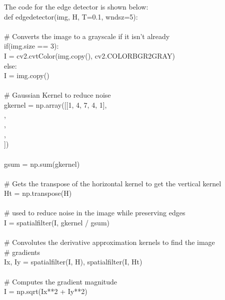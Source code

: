 \documentclass{article}
\begin{document}
	The code for the edge detector is shown below:\\
	
	\noindent def edge\textunderscore detector(img, H, T=0.1, wndsz=5):\\
	\\
	\indent \# Converts the image to a grayscale if it isn't already\\
	\indent if(img.size == 3):\\
	\indent \indent I = cv2.cvtColor(img.copy(), cv2.COLOR\textunderscore BGR2GRAY)\\
	\indent else:\\
	\indent \indent I = img.copy()\\
	\\
	\indent \# Gaussian Kernel to reduce noise\\
	\indent g\textunderscore kernel = np.array([[1, 4, 7, 4, 1],\\
	\indent \indent [4, 20, 33, 20, 4],\\
	\indent \indent [7, 33, 55, 33, 7],\\
	\indent \indent [4, 20, 33, 20, 4],\\
	\indent \indent [1, 4, 7, 4, 1]])\\
	\\
	\indent g\textunderscore sum = np.sum(g\textunderscore kernel)  \\ 
	\\
	\indent \# Gets the transpose of the horizontal kernel to get the vertical kernel\\
	\indent H\textunderscore t = np.transpose(H)\\
	\\
	\indent \# used to reduce noise in the image while preserving edges\\
	\indent I = spatial\textunderscore filter(I, g\textunderscore kernel / g\textunderscore sum) \\ 
	\\
	\indent \# Convolutes the derivative approximation kernels to find the image \\
	\indent \# gradients\\
	\indent I\textunderscore x, I\textunderscore y = spatial\textunderscore filter(I, H), spatial\textunderscore filter(I, H\textunderscore t)\\
	\\
	\indent \# Computes the gradient magnitude\\
	\indent I = np.sqrt(I\textunderscore x**2 + I\textunderscore y**2)\\
\end{document}
